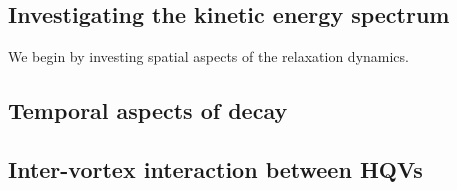 \subsection{Investigating the kinetic energy spectrum}
We begin by investing spatial aspects of the relaxation dynamics.

\subsection{Temporal aspects of decay}

\subsection{Inter-vortex interaction between HQVs}
